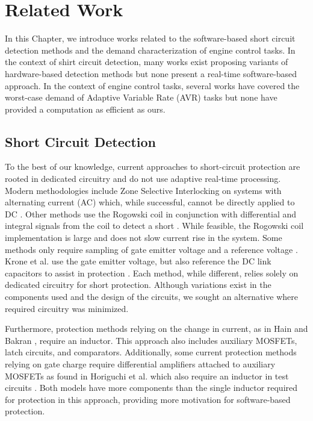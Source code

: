 \section{Related Work}   \label{chap:relatedWork}

In this Chapter, we introduce works related to the software-based short circuit detection methods and the demand characterization of engine control tasks.
In the context of shirt circuit detection, many works exist proposing variants of hardware-based detection methods but none present a real-time software-based approach.
In the context of engine control tasks, several works have covered the worst-case demand of Adaptive Variable Rate (AVR) tasks but none have provided a computation as efficient as ours.

\subsection{Short Circuit Detection} \label{subsec:scd-relatedWork}

To the best of our knowledge, current approaches to short-circuit protection are rooted in dedicated circuitry and do not use adaptive real-time processing.
Modern methodologies include Zone Selective Interlocking on systems with alternating current (AC) which, while successful, cannot be directly applied to DC \cite{du_new_2014}.
Other methods use the Rogowski coil in conjunction with differential and integral signals from the coil to detect a short \cite{wang_new_2011}.
While feasible, the Rogowski coil implementation is large and does not slow current rise in the system.
Some methods only require sampling of gate emitter voltage and a reference voltage \cite{horiguchi_short_2014}.
Krone et al. use the gate emitter voltage, but also reference the DC link capacitors to assist in protection \cite{krone_fast_2015}.
Each method, while different, relies solely on dedicated circuitry for short protection.
Although variations exist in the components used and the design of the circuits, we sought an alternative where required circuitry was minimized.

Furthermore, protection methods relying on the change in current, as in Hain and Bakran \cite{hain_new_2016}, require an inductor.
This approach also includes auxiliary MOSFETs, latch circuits, and comparators.
Additionally, some current protection methods relying on gate charge require differential amplifiers attached to auxiliary MOSFETs as found in Horiguchi et al. which also require an inductor in test circuits \cite{horiguchi_high-speed_2015}.
Both models have more components than the single inductor required for protection in this approach, providing more motivation for software-based protection.


